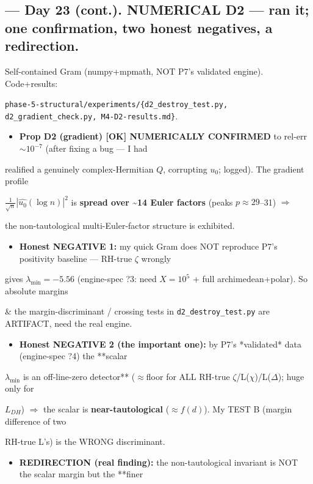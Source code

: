 \documentclass[10pt]{article}
\begin{document}
\subsection*{ --- Day 23 (cont.). NUMERICAL D2 --- ran it; one confirmation, two honest negatives, a redirection.}
Self-contained Gram (numpy+mpmath, NOT P7's validated engine). Code+results:\par
\texttt{phase-5-structural/experiments/\{d2\_destroy\_test.py, d2\_gradient\_check.py, M4-D2-results.md\}}.\par
\begin{itemize}
\item \textbf{Prop D2 (gradient) [OK] NUMERICALLY CONFIRMED} to rel-err $\sim10^{-7}$ (after fixing a bug --- I had
\end{itemize}
  realified a genuinely complex-Hermitian $Q$, corrupting $u_0$; logged). The gradient profile\par
  $\tfrac1{\sqrt n}|\widehat{u_0}(\log n)|^2$ is \textbf{spread over \textasciitilde{}14 Euler factors} (peaks $p\approx29$--31) \ensuremath{\Rightarrow}\par
  the non-tautological multi-Euler-factor structure is exhibited.\par
\begin{itemize}
\item \textbf{Honest NEGATIVE 1:} my quick Gram does NOT reproduce P7's positivity baseline --- RH-true $\zeta$ wrongly
\end{itemize}
  gives $\lambda_{\min}=-5.56$ (engine-spec ?3: need $X=10^5$ + full archimedean+polar). So absolute margins\par
  \& the margin-discriminant / crossing tests in \texttt{d2\_destroy\_test.py} are ARTIFACT, need the real engine.\par
\begin{itemize}
\item \textbf{Honest NEGATIVE 2 (the important one):} by P7's *validated* data (engine-spec ?4) the **scalar
\end{itemize}
  $\lambda_{\min}$ is an off-line-zero detector** ($\approx$floor for ALL RH-true \ensuremath{\zeta}/L(\ensuremath{\chi})/L(\ensuremath{\Delta}); huge only for\par
  $L_{DH}$) \ensuremath{\Rightarrow} the scalar is \textbf{near-tautological} ($\approx f(d)$). My TEST B (margin difference of two\par
  RH-true L's) is the WRONG discriminant.\par
\begin{itemize}
\item \textbf{REDIRECTION (real finding):} the non-tautological invariant is NOT the scalar margin but the **finer
\end{itemize}
\end{document}
